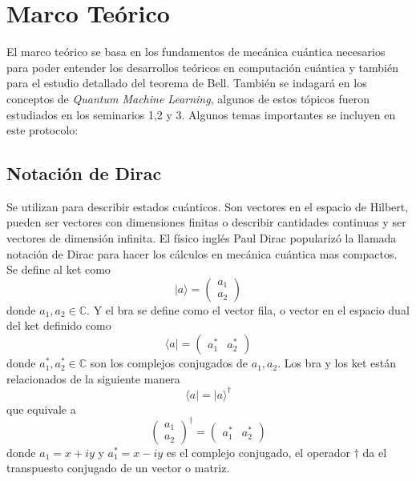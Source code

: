 \documentclass[a4paper]{article}
\begin{document}
\section{Marco Teórico}
El marco teórico se basa en los fundamentos de mecánica cuántica necesarios para poder entender los desarrollos teóricos en computación cuántica y también para el estudio detallado del teorema de Bell\cite{Bell}. También se indagará en los conceptos de \textit{Quantum Machine Learning}, algunos de estos tópicos fueron estudiados en los seminarios 1,2 y 3. Algunos temas importantes se incluyen en este protocolo:
\subsection{Notación de Dirac}
Se utilizan para describir estados cuánticos. Son vectores en el espacio de Hilbert, pueden ser vectores con dimensiones finitas o describir cantidades continuas y ser vectores de dimensión infinita. El físico inglés Paul Dirac popularizó la llamada notación de Dirac para hacer los cálculos en mecánica cuántica mas compactos.
Se define al ket como
\begin{equation}
|a\rangle=
	\begin{pmatrix}
		a_1\\
		a_2
	\end{pmatrix}
\end{equation}
donde $a_1, a_2 \in \mathbb{C} $. Y el bra se define como el vector fila, o vector en el espacio dual del ket definido como 
\begin{equation}
\langle a|=
	\begin{pmatrix}
		a_1^*&a_2^*
	\end{pmatrix}
\end{equation}
donde $a_1^*, a_2^* \in \mathbb{C} $ son los complejos conjugados de $a_1, a_2$.
Los bra y los ket están relacionados de la siguiente manera
\begin{equation}
\langle a|=|a\rangle^\dagger
\end{equation}
que equivale a 
\begin{equation}
\begin{pmatrix}
		a_1\\
		a_2
	\end{pmatrix}^\dagger=
	\begin{pmatrix}
		a_1^*&a_2^*
	\end{pmatrix}
\end{equation}
donde $a_1=x+iy$ y $a_1^*=x-iy$ es el complejo conjugado, el operador $\dagger$ da el transpuesto conjugado de un vector o matriz.\\
\end{document}
